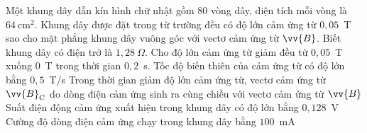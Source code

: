 	\begin{ex}%
		Một khung dây dẫn kín hình chữ nhật gồm $80$ vòng dây, diện tích mỗi vòng là $64~\text{cm}^2$. Khung dây được đặt trong từ trường đều có độ lớn cảm ứng từ $0{,}05$~T sao cho mặt phẳng khung dây vuông góc với vectơ cảm ứng từ $\vv{B}$. Biết khung dây có điện trở là $1{,}28~\Omega$. Cho độ lớn cảm ứng từ giảm đều từ $0{,}05$~T xuống $0$~T trong thời gian $0{,}2$~s.
		\choiceTFt
		{Tốc độ biến thiên của cảm ứng từ có độ lớn bằng $0{,}5$~T/s}
		{\True Trong thời gian giảm độ lớn cảm ứng từ, vectơ cảm ứng từ $\vv{B}_\text{C}$ do dòng điện cảm ứng sinh ra cùng chiều với vectơ cảm ứng từ $\vv{B}$}
		{\True Suất điện động cảm ứng xuất hiện trong khung dây có độ lớn bằng $0{,}128$~V}
		{\True Cường độ dòng điện cảm ứng chạy trong khung dây bằng $100$~mA}
	\end{ex}

